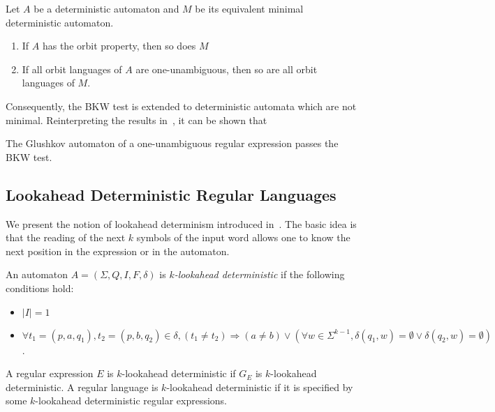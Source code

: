 \documentclass{llncs}
\begin{document}
\begin{lemma}[\cite{BW98}]\label{lm:1NA}
	Let $A$ be a deterministic automaton and $M$ be its equivalent minimal deterministic automaton.
	\begin{enumerate}
		\item If $A$ has the orbit property, then so does $M$
		\item If all orbit languages of $A$ are one-unambiguous, then so are all orbit languages of $M$.
	\end{enumerate}
\end{lemma}
	Consequently, 
	the BKW test is extended to deterministic automata which are not minimal.
	Reinterpreting the results in~\cite{BW98}, it can be shown that
	
\begin{lemma}\label{lm:GlushkovBKW}
	  The Glushkov automaton of a one-unambiguous regular expression passes the BKW test.
\end{lemma}
	
	
\subsection{Lookahead Deterministic Regular Languages}

	We present the notion of lookahead determinism introduced in~\cite{HW08}.
	The basic idea is that the reading of the next $k$ symbols of the input word allows one to know the next position in the expression or in the automaton.
	
\begin{definition}
	An automaton $A = (\Sigma, Q, I, F, \delta)$ is \emph{$k$-lookahead deterministic} if the following conditions hold:
	\begin{itemize}
		\item $|I| = 1$
		\item $\forall t_1 = (p, a, q_1), t_2 = (p, b, q_2) \in \delta, (t_1 \neq t_2) \Longrightarrow (a \neq b) \vee (\forall w \in \Sigma^{k-1}, \delta(q_1, w) = \emptyset \vee \delta(q_2, w) = \emptyset)$.
	\end{itemize}
\end{definition}

\begin{definition}
	A regular expression $E$ is $k$-lookahead deterministic if $G_E$ is $k$-lookahead deterministic.
	A regular language is $k$-lookahead deterministic if it is specified by some $k$-lookahead deterministic regular expressions.
\end{definition}
\end{document}
